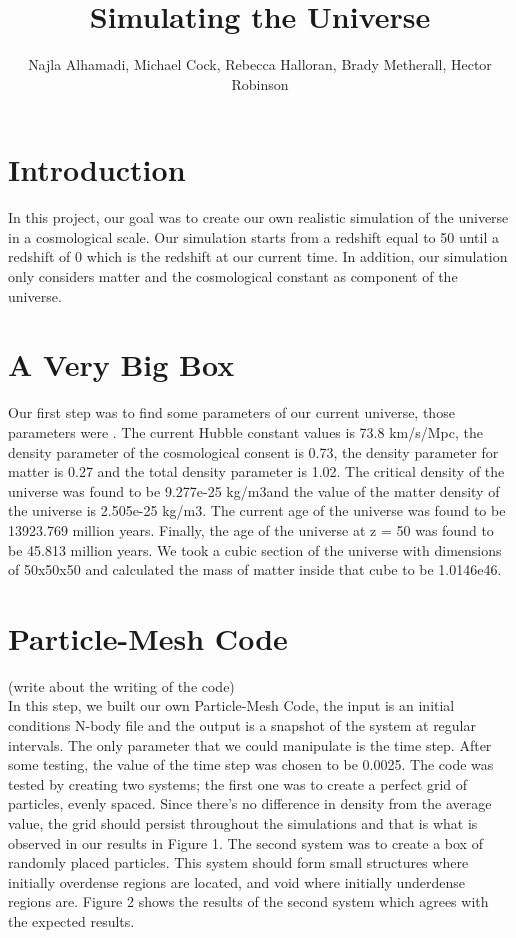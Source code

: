 \documentclass[10pt]{article}
\title{Simulating the Universe}
\author{Najla Alhamadi, Michael Cock, Rebecca Halloran, Brady Metherall, Hector Robinson}
\begin{document}
\maketitle
\section{Introduction}
	In this project, our goal was to create our own realistic simulation of the universe in a cosmological scale. Our simulation starts from a redshift equal to 50 until a redshift of 0 which is the redshift at our current time. In addition, our simulation only considers matter and the cosmological constant as component of the universe. 
\section{A Very Big Box}
	Our first step was to find some parameters of our current universe, those parameters were . The current Hubble constant values is 73.8 km/s/Mpc, the density parameter of the cosmological consent is 0.73, the density parameter for matter is 0.27 and the total density parameter is 1.02. The critical density of the universe was found to be 9.277e-25 kg/m3and the value of the matter density of the universe is 2.505e-25 kg/m3. The current age of the universe was found to be 13923.769 million years. Finally, the age of the universe at z = 50 was found to be 45.813 million years. We took a cubic section of the universe with dimensions of 50x50x50 and calculated the mass of matter inside that cube to be 1.0146e46. 
\section{Particle-Mesh Code}
 (write about the writing of the code) \\
	In this step, we built our own Particle-Mesh Code, the input is an initial conditions N-body file and the output is a snapshot of the system at regular intervals. The only parameter that we could manipulate is the time step. After some testing, the value of the time step was chosen to be 0.0025. The code was tested by creating two systems; the first one was to create a perfect grid of particles, evenly spaced. Since there’s no difference in density from the average value, the grid should persist throughout the simulations and that is what is observed in our results in Figure 1. The second system was to create a box of randomly placed particles. This system should form small structures where initially overdense regions are located, and void where initially underdense regions are. Figure 2 shows the results of the second system which agrees with the expected results.       
\end{document}
